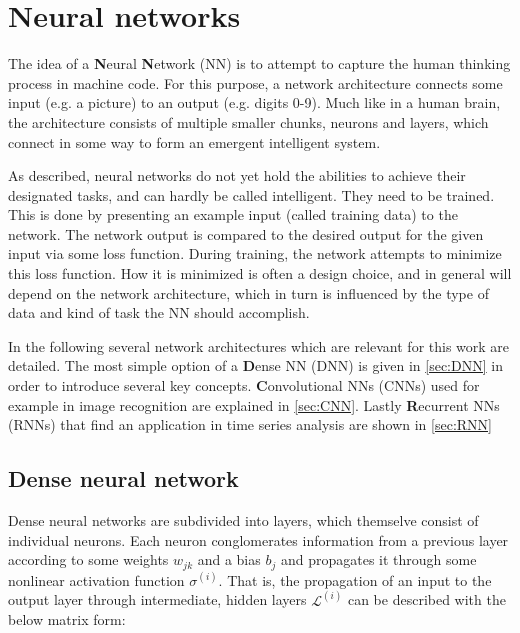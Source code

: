 
\chapter{Neural networks}
\label{chap:neural-networks}

The idea of a \textbf{N}eural \textbf{N}etwork (NN) is to attempt to capture the human thinking process in machine code. For this purpose, a network architecture
connects some input (e.g. a picture) to an output (e.g. digits 0-9). Much like in a human brain, the architecture consists of multiple smaller chunks, neurons 
and layers, which connect in some way to form an emergent intelligent system. 

As described, neural networks do not yet hold the abilities to achieve their designated tasks, and can hardly be called intelligent. They need to be trained. 
This is done by presenting an example input (called training data) to the network. The network output is compared to the desired output for the given input via 
some loss function. During training, the network attempts to minimize this loss function. How it is minimized is often a design choice, and in general will 
depend on the network architecture, which in turn is influenced by the type of data and kind of task the NN should accomplish.

In the following several network architectures which are relevant for this work are detailed. The most simple option of a \textbf{D}ense NN (DNN) is given in 
\autoref{sec:DNN} in order to introduce several key concepts. \textbf{C}onvolutional NNs (CNNs) used for example in image recognition are explained in 
\autoref{sec:CNN}. Lastly \textbf{R}ecurrent NNs (RNNs) that find an application in time series analysis are shown in \autoref{sec:RNN}

\section{Dense neural network}
\label{sec:DNN}

Dense neural networks are subdivided into layers, which themselve consist of individual neurons. Each neuron conglomerates information from a previous layer 
according to some weights $w_{jk}$ and a bias $b_j$ and propagates it through some nonlinear activation function $\sigma^{(i)}$. That is, the propagation of 
an input to the output layer through intermediate, hidden layers $\mathcal{L}^{(i)}$ can be described with the below matrix form:

